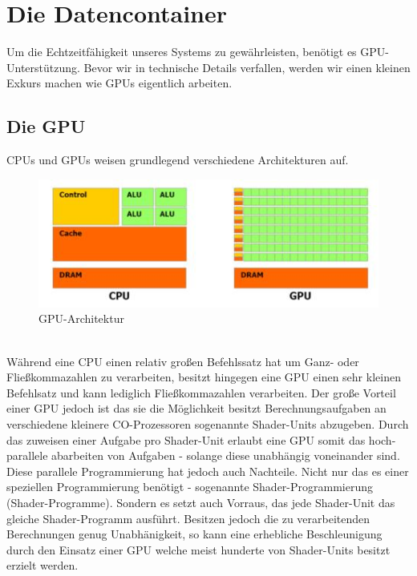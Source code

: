 \section{Die Datencontainer}
\begin{Spacing}{\mylinespace}
Um die Echtzeitfähigkeit unseres Systems zu gewährleisten, benötigt es GPU-Unterstützung.
Bevor wir in technische Details verfallen, werden wir einen kleinen Exkurs machen wie GPUs eigentlich arbeiten.
\subsection{Die GPU}
CPUs und GPUs weisen grundlegend verschiedene Architekturen auf.
\begin{figure}[h!]
	\vspace*{30px}
	\includegraphics[width=\columnwidth]{graphics/GPUvsCPU.jpg}	
	\caption{GPU-Architektur\protect\footnotemark}
	\label{fig:GPUvsCPU}
\end{figure}
\\
Während eine CPU einen relativ großen Befehlssatz hat um Ganz- oder Fließkommazahlen zu verarbeiten, besitzt hingegen eine GPU einen sehr kleinen Befehlsatz und kann lediglich Fließkommazahlen verarbeiten.
Der große Vorteil einer GPU jedoch ist das sie die Möglichkeit besitzt Berechnungsaufgaben an verschiedene kleinere CO-Prozessoren sogenannte Shader-Units abzugeben.
Durch das zuweisen einer Aufgabe pro Shader-Unit erlaubt eine GPU somit das hoch-parallele abarbeiten von Aufgaben - solange diese unabhängig voneinander sind.
Diese parallele Programmierung hat jedoch auch Nachteile.
Nicht nur das es einer speziellen Programmierung benötigt - sogenannte Shader-Programmierung (Shader-Programme).
Sondern es setzt auch Vorraus, das jede Shader-Unit das gleiche Shader-Programm ausführt.
Besitzen jedoch die zu verarbeitenden Berechnungen genug Unabhänigkeit, so kann eine erhebliche Beschleunigung durch den Einsatz einer GPU welche meist hunderte von Shader-Units besitzt erzielt werden.



\end{Spacing}
